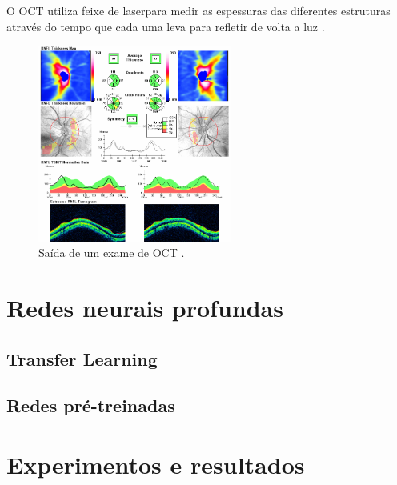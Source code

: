 \documentclass[conference]{IEEEtran}
\begin{document}
O OCT utiliza feixe de laserpara medir as espessuras das diferentes estruturas através do tempo que cada uma leva para refletir de volta a luz \cite{huang1991}.   %



\begin{figure}[!tp]
  \centering
  \includegraphics[width=2.5in]{img/oct.png}
  \caption{Saída de um exame de OCT \cite{Populacoes2009}.}
  \label{fig:oct}
\end{figure}

\section{Redes neurais profundas}



  \subsection{Transfer Learning}


  \subsection{Redes pré-treinadas}


\section{Experimentos e resultados}

\end{document}
